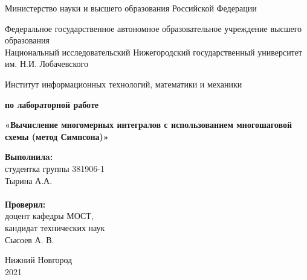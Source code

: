\documentclass{report}
\begin{document}
\begin{titlepage}

\begin{center}
Министерство науки и высшего образования Российской Федерации
\end{center}

\begin{center}
Федеральное государственное автономное образовательное учреждение высшего образования \\
Национальный исследовательский Нижегородский государственный университет им. Н.И. Лобачевского
\end{center}

\begin{center}
Институт информационных технологий, математики и механики
\end{center}

\vspace{4em}

\begin{center}
\textbf{ по лабораторной работе} \\
\end{center}
\begin{center}
\textbf{\Large«Вычисление многомерных интегралов с использованием многошаговой схемы 
(метод Симпсона)»} \\
\end{center}

\vspace{4em}

\newbox{\lbox}
\newlength{\maxl}
\setlength{\maxl}{\wd\lbox}
\hfill\parbox{7cm}{
\hspace*{5cm}\hspace*{-5cm}\textbf{Выполнилa:} \\ студентка группы 381906-1 \\ Тырина А.А. \\
\\
\hspace*{5cm}\hspace*{-5cm}\textbf{Проверил:}\\ доцент кафедры МОСТ, \\ кандидат технических наук \\ Сысоев А. В.\\
}
\vspace{\fill}

\begin{center} Нижний Новгород \\ 2021 \end{center}

\end{titlepage}
\end{document}
